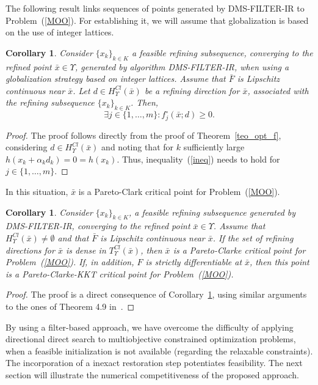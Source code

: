 \documentclass[12pt]{article}
\newtheorem{corollary}[theorem]{Corollary}
\newcommand{\set}[1]{\{#1\}}
\begin{document}
The following result links sequences of points generated by
DMS-FILTER-IR to Problem~(\ref{MOO}). For establishing it, we will
assume that globalization is based on the use of integer lattices.
\begin{corollary}\label{corol:feasible}
Consider $\{x_k\}_{k\in K}$ a feasible refining subsequence,
converging to the refined point $\bar{x}\in \Upsilon$, generated
by algorithm DMS-FILTER-IR, when using a globalization strategy
based on integer lattices. Assume that $\bar{F}$ is Lipschitz
continuous near $\bar{x}$. Let $d\in H^{Cl}_{\Upsilon}(\bar{x})$
be a refining direction for $\bar{x}$, associated with the
refining subsequence $\{x_k\}_{k\in K}$. Then,
$$\exists j\in\set{1,\ldots,m}: f_j^\circ(\bar{x};d)\geq
0.$$
\end{corollary}
\begin{proof}
The proof follows directly from the proof of
Theorem~\ref{teo_opt_f}, considering $d\in
H^{Cl}_{\Upsilon}(\bar{x})$ and noting that for $k$ sufficiently
large $h(x_k+\alpha_k d_k)=0=h(x_k)$. Thus,
inequality~(\ref{ineq}) needs to hold for $j\in\set{1,\ldots,m}$.
\end{proof}

In this situation, $\bar{x}$ is a Pareto-Clark critical point for
Problem~(\ref{MOO}).

\begin{corollary}
Consider $\{x_k\}_{k\in K}$, a feasible refining subsequence
generated by DMS-FILTER-IR, converging to the refined point
$\bar{x}\in \Upsilon$. Assume that
$H_{\Upsilon}^{Cl}(\bar{x})\neq\emptyset$ and that $\bar{F}$ is
Lipschitz continuous near $\bar{x}$. If the set of refining
directions for $\bar{x}$ is dense in $T^{Cl}_{\Upsilon}(\bar{x})$,
then $\bar{x}$ is a Pareto-Clarke critical point for
Problem~(\ref{MOO}). If, in addition, $F$ is strictly
differentiable at $\bar{x}$, then this point is a
Pareto-Clarke-KKT critical point for Problem~(\ref{MOO}).
\end{corollary}
\begin{proof}
The proof is a direct consequence of
Corollary~\ref{corol:feasible}, using similar arguments to the
ones of Theorem 4.9 in~\cite{custodio2011}.
\end{proof}

By using a filter-based approach, we have overcome the difficulty
of applying directional direct search to multiobjective
constrained optimization problems, when a feasible initialization
is not available (regarding the relaxable constraints). The
incorporation of a inexact restoration step potentiates
feasibility. The next section will illustrate the numerical
competitiveness of the proposed approach.
\end{document}
